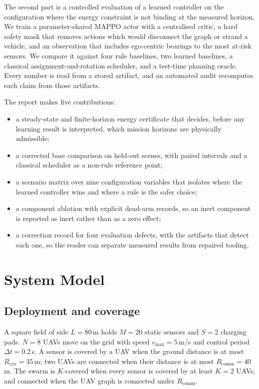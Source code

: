 \documentclass[conference]{IEEEtran}
\begin{document}
The second part is a controlled evaluation of a learned controller on the configuration where the energy constraint is not binding at the measured horizon. We train a parameter-shared MAPPO actor with a centralised critic, a hard safety mask that removes actions which would disconnect the graph or strand a vehicle, and an observation that includes ego-centric bearings to the most at-risk sensors. We compare it against four rule baselines, two learned baselines, a classical assignment-and-rotation scheduler, and a test-time planning oracle. Every number is read from a stored artifact, and an automated audit recomputes each claim from those artifacts.

The report makes five contributions:
\begin{itemize}
\item a steady-state and finite-horizon energy certificate that decides, before any learning result is interpreted, which mission horizons are physically admissible;
\item a corrected base comparison on held-out scenes, with paired intervals and a classical scheduler as a non-rule reference point;
\item a scenario matrix over nine configuration variables that isolates where the learned controller wins and where a rule is the safer choice;
\item a component ablation with explicit dead-arm records, so an inert component is reported as inert rather than as a zero effect;
\item a correction record for four evaluation defects, with the artifacts that detect each one, so the reader can separate measured results from repaired tooling.
\end{itemize}

\section{System Model}
\subsection{Deployment and coverage}
A square field of side $L=80$\,m holds $M=20$ static sensors and $S=2$ charging pads. $N=8$ UAVs move on the grid with speed $v_{\max}=5$\,m/s and control period $\Delta t=0.2$\,s. A sensor is covered by a UAV when the ground distance is at most $R_{\mathrm{cov}}=35$\,m; two UAVs are connected when their distance is at most $R_{\mathrm{comm}}=40$\,m. The swarm is $K$-covered when every sensor is covered by at least $K=2$ UAVs, and connected when the UAV graph is connected under $R_{\mathrm{comm}}$.
\end{document}
